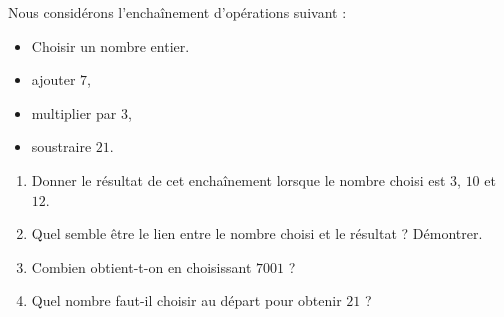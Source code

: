 
\begin{exercice}[\ldots /5]\label{exosmath-0827}

Nous considérons l'enchaînement d'opérations suivant :
\begin{itemize}
    \item Choisir un nombre entier.
    \item ajouter \( 7\),
    \item multiplier par \( 3\),
    \item soustraire \( 21\).
\end{itemize}
\begin{enumerate}
    \item
        Donner le résultat de cet enchaînement lorsque le nombre choisi est \( 3\), \( 10\) et \( 12\).
    \item
        Quel semble être le lien entre le nombre choisi et le résultat ? Démontrer.
    \item
        Combien obtient-t-on en choisissant \( 7001\) ?
    \item
        Quel nombre faut-il choisir au départ pour obtenir \( 21\) ?
\end{enumerate}

\end{exercice}
